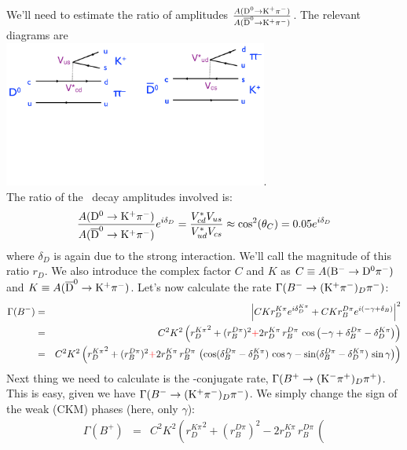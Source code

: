 \begin{enumerate}[a)]
{\begin{itemize}
      We'll need to estimate the ratio of amplitudes $\frac{A({\rm {\rm D^{0}} \to
          K^+ \pi^-})}{A({\rm {\rm \overline{D}^0}\to K^+\pi^-})}$. The relevant diagrams
      are
      \\\includegraphics[width=0.65\textwidth]{problemsheets/ps2figs/D2KpiDiagrams}.\\
      The ratio of the \Do\ decay amplitudes involved is:
      \[
      \frac{A({\rm {\rm D^{0}} \to K^+ \pi^-})}{A({\rm {\rm \overline{D}^0}\to
          K^+\pi^-})} e^{i\delta_D}
      =
      \frac{V_{cd}^* V_{us}}{ V_{ud}^* V_{cs}}
      \approx \cos^2(\theta_C) = 0.05 e^{i\delta_D}
      \]
      where $\delta_D$ is again due to the strong interaction. We'll call
      the magnitude of this ratio $r_D$. We also introduce the complex
      factor $C$ and $K$ as $C \equiv A({\rm B^- \to {\rm D^{0}} \pi^-})$ and $K
      \equiv A({\rm {\rm \overline{D}^0}\to K^+\pi^-})$.
      Let's now calculate the rate $\Gamma(B^- \to ({\rm K^+} {\rm \pi^-})_D \pi^-)$:
      \begin{eqnarray*}
        \Gamma(B^-) & = & 
        \left| CK r_D^{K\pi} e^{i\delta_D^{K\pi}} + CK r_B^{D\pi} e^{i(-\gamma + \delta_B)} \right|^2
        \\ & = &
        C^2 K^2 \left({r_D^{K\pi}}^2 + (r_B^{D\pi})^2 {\color{red}+} 2r_D^{K\pi}\,r_B^{D\pi}\,\cos\left(-\gamma +\delta_B^{D\pi}-\delta_D^{K\pi} \right)\right)
        \\ & = & C^2K^2\left({r_D^{K\pi}}^2 + (r_B^{D\pi})^2 {\color{red}+} 2r_D^{K\pi}\,r_B^{D\pi}\, \left(
            \cos(\delta_B^{D\pi}-\delta_D^{K\pi})\,\cos\gamma -
            \sin(\delta_B^{D\pi}-\delta_D^{K\pi})\,\sin\gamma\right)\right)
      \end{eqnarray*}
      Next thing we need to calculate is the \cp-conjugate rate,
      $\Gamma(B^+ \to ({\rm K^-} {\rm \pi^+})_D \pi^+)$.
      This is easy, given we have $\Gamma(B^- \to ({\rm K^+} {\rm \pi^-})_D \pi^-)$. We
      simply change the sign of the weak (CKM) phases (here, only $\gamma$):
      \begin{eqnarray*}
        \Gamma(B^+) & = & 
        C^2K^2\left({r_D^{K\pi}}^2 + (r_B^{D\pi})^2 - 2r_D^{K\pi}\,r_B^{D\pi}\, \left(

\end{eqnarray*}
\end{itemize}}
\end{enumerate}
